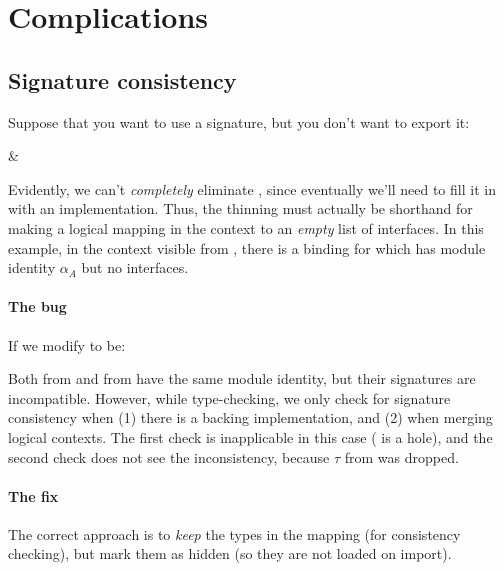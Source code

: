 \documentclass{article}
\begin{document}
\section{Complications}

\subsection{Signature consistency}

Suppose that you want to use a signature, but you don't want to export it:

\begin{example}
 &
\end{example}

Evidently, we can't \emph{completely} eliminate , since eventually
we'll need to fill it in with an implementation.  Thus, the thinning
must actually be shorthand for making a logical mapping in the context
to an \emph{empty} list of interfaces.  In this example, in the context
visible from , there is a binding for  which has module
identity $\alpha_A$ but no interfaces.

\paragraph{The bug} If we modify  to be:

\begin{example}
\end{example}

Both  from  and  from  have the same module
identity, but their signatures are incompatible.  However, while
type-checking, we only check for signature consistency when (1) there is
a backing implementation, and (2) when merging logical contexts.  The
first check is inapplicable in this case ( is a hole), and the
second check does not see the inconsistency, because $\tau$ from
 was dropped.

\paragraph{The fix} The correct approach is to \emph{keep} the
types in the mapping (for consistency checking), but mark them as hidden
(so they are not loaded on import).
\end{document}
